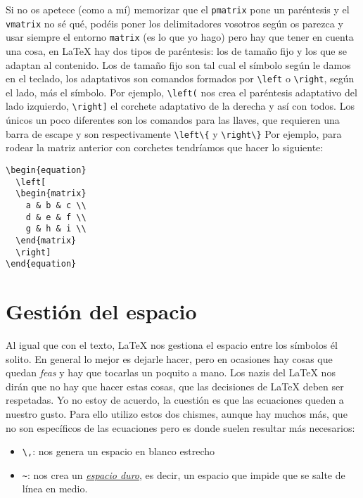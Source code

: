 Si no os apetece (como a mí) memorizar que el \lstinline!pmatrix! pone
un paréntesis y el \lstinline!vmatrix! no sé qué, podéis poner los
delimitadores vosotros según os parezca y usar siempre el entorno
\lstinline!matrix! (es lo que yo hago) pero hay que tener en cuenta una
cosa, en LaTeX hay dos tipos de paréntesis: los de tamaño fijo y los que
se adaptan al contenido. Los de tamaño fijo son tal cual el símbolo
según le damos en el teclado, los adaptativos son comandos formados por
\lstinline!\left! o \lstinline!\right!, según el lado, más el símbolo.
Por ejemplo, \lstinline!\left(! nos crea el paréntesis adaptativo del
lado izquierdo, \lstinline!\right]! el corchete adaptativo de la derecha
y así con todos. Los únicos un poco diferentes son los comandos para las
llaves, que requieren una barra de escape y son respectivamente
\lstinline!\left\{! y \lstinline!\right\}! Por ejemplo, para rodear la
matriz anterior con corchetes tendríamos que hacer lo siguiente:

\begin{lstlisting}[language={[latex]tex}]
\begin{equation}
  \left[
  \begin{matrix}
    a & b & c \\
    d & e & f \\
    g & h & i \\
  \end{matrix}
  \right]
\end{equation}
\end{lstlisting}

\section{Gestión del espacio}\label{sec:espacio}

Al igual que con el texto, LaTeX nos gestiona el espacio entre los
símbolos él solito. En general lo mejor es dejarle hacer, pero en
ocasiones hay cosas que quedan \emph{feas} y hay que tocarlas un
poquito a mano. Los nazis del LaTeX nos dirán que no hay que hacer estas
cosas, que las decisiones de LaTeX deben ser respetadas. Yo no estoy de
acuerdo, la cuestión es que las ecuaciones queden a nuestro gusto. Para
ello utilizo estos dos chismes, aunque hay muchos más, que no son
específicos de las ecuaciones pero es donde suelen resultar más
necesarios:

\begin{itemize}
\item
  \lstinline!\,!: nos genera un espacio en blanco estrecho
\item
  \lstinline!~!: nos crea un
  \href{https://es.wikipedia.org/wiki/Espacio_duro}{\emph{espacio
  duro}}, es decir, un espacio que impide que se salte de línea en
  medio.
\end{itemize}

